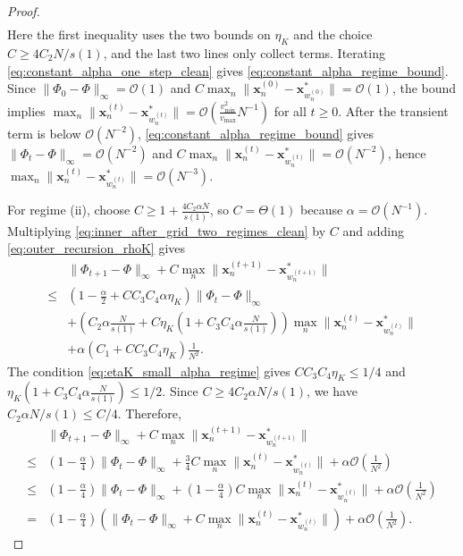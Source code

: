 \documentclass{article}
\newcommand{\Oc}{\mathcal{O}}
\newcommand{\bx}{\mathbf{x}}
\newcommand{\Farc}{\Phi}
\begin{document}
\begin{proof}
\begin{align}
\end{align}
Here the first inequality uses the two bounds on $\eta_K$ and the choice $C\ge4C_2N/s(1)$, and the last two lines only collect terms. Iterating \eqref{eq:constant_alpha_one_step_clean} gives \eqref{eq:constant_alpha_regime_bound}. Since $\|\Farc_0-\Farc\|_\infty=\Oc(1)$ and $C\max_n\|\bx_n^{(0)}-\bx_{w_n^{(0)}}^*\|=\Oc(1)$, the bound implies $\max_n\|\bx_n^{(t)}-\bx_{w_n^{(t)}}^*\|=\Oc\left(\frac{v_{\min}^2}{v_{\max}}N^{-1}\right)$ for all $t\ge0$. After the transient term is below $\Oc(N^{-2})$, \eqref{eq:constant_alpha_regime_bound} gives $\|\Farc_t-\Farc\|_\infty=\Oc(N^{-2})$ and $C\max_n\|\bx_n^{(t)}-\bx_{w_n^{(t)}}^*\|=\Oc(N^{-2})$, hence $\max_n\|\bx_n^{(t)}-\bx_{w_n^{(t)}}^*\|=\Oc(N^{-3})$.

For regime (ii), choose $C\ge 1+\frac{4C_2\alpha N}{s(1)}$, so $C=\Theta(1)$ because $\alpha=\Oc(N^{-1})$. Multiplying \eqref{eq:inner_after_grid_two_regimes_clean} by $C$ and adding \eqref{eq:outer_recursion_rhoK} gives
\begin{align}
&\|\Farc_{t+1}-\Farc\|_\infty+C\max_n\|\bx_n^{(t+1)}-\bx_{w_n^{(t+1)}}^*\| \nonumber\\
\leq&
\left(1-\frac{\alpha}{2}+CC_3C_4\alpha\eta_K\right)\|\Farc_t-\Farc\|_\infty \nonumber\\
&+\left(C_2\alpha\frac{N}{s(1)}+C\eta_K\left(1+C_3C_4\alpha\frac{N}{s(1)}\right)\right)\max_n\|\bx_n^{(t)}-\bx_{w_n^{(t)}}^*\| \nonumber\\
&+\alpha\left(C_1+CC_3C_4\eta_K\right)\frac1{N^2}.
\label{eq:small_alpha_expand_clean}
\end{align}
The condition \eqref{eq:etaK_small_alpha_regime} gives $CC_3C_4\eta_K\le 1/4$ and $\eta_K\left(1+C_3C_4\alpha\frac{N}{s(1)}\right)\le 1/2$. Since $C\ge4C_2\alpha N/s(1)$, we have $C_2\alpha N/s(1)\le C/4$. Therefore,
\begin{align}
&\|\Farc_{t+1}-\Farc\|_\infty+C\max_n\|\bx_n^{(t+1)}-\bx_{w_n^{(t+1)}}^*\| \nonumber\\
\leq&
\left(1-\frac{\alpha}{4}\right)\|\Farc_t-\Farc\|_\infty+\frac34 C\max_n\|\bx_n^{(t)}-\bx_{w_n^{(t)}}^*\|+\alpha\Oc\left(\frac1{N^2}\right) \nonumber\\
\leq&
\left(1-\frac{\alpha}{4}\right)\|\Farc_t-\Farc\|_\infty+\left(1-\frac{\alpha}{4}\right)C\max_n\|\bx_n^{(t)}-\bx_{w_n^{(t)}}^*\|+\alpha\Oc\left(\frac1{N^2}\right) \nonumber\\
=&
\left(1-\frac{\alpha}{4}\right)\left(\|\Farc_t-\Farc\|_\infty+C\max_n\|\bx_n^{(t)}-\bx_{w_n^{(t)}}^*\|\right)+\alpha\Oc\left(\frac1{N^2}\right).

\end{align}
\end{proof}
\end{document}
